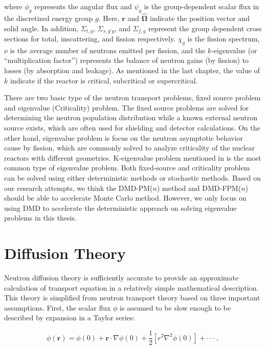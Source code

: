 where $\phi_g$ represents the angular flux and $\psi_g$ is the group-dependent scalar flux in the discretized energy group $g$.  
Here, $\mathbf{r}$ and $\bm{\hat{\Omega}}$ indicate the position vector and solid angle.
In addition, $\Sigma_{t,g}$, $\Sigma_{s,g\prime g}$, and $\Sigma_{f,g}$ represent the group dependent cross sections for total, inscattering, and fission respectively.  
$\chi_g$ is the fission spectrum, $\nu$ is the average number of neutrons emitted per fission, and the $k$-eigenvalue (or ``multiplication factor'') represents the balance of neutron gains (by fission) to losses (by absorption and leakage).  
As mentioned in the last chapter, the value of $k$ indicate if the reactor is critical, subcritical or supercritical.

There are two basic type of the neutron transport problems, fixed source problem and eigenvalue (Criticality) problem.  
The fixed source problems are solved for determining the neutron population distribution while a known external neutron source exists, which are often used for shielding and detector calculations.
On the other hand, eigenvalue problem is focus on the neutron asymptotic behavior cause by fission, which are commonly solved to analyze criticality of the nuclear reactors with different geometries.
K-eigenvalue problem mentioned in  is the most common type of eigenvalue problem.
Both fixed-source and criticality problem can be solved using either deterministic methods or stochastic methods.
Based on our research attempts, we think the DMD-PM($n$) method and DMD-FPM($n$) should be able to accelerate Monte Carlo method. 
However, we only focus on using DMD to accelerate the deterministic approach on solving eigenvalue problems in this thesis.

\section{Diffusion Theory}
Neutron diffusion theory is sufficiently accurate to provide an approximate calculation of transport equation in a relatively simple mathematical description.
This theory is simplified from neutron transport theory based on three important assumptions\cite{stacey2018nuclear}.
First, the scalar flux $\phi$ is assumed to be slow enough to be described by expansion in a Taylor series:

\begin{equation}
 \phi(\mathbf{r}) = \phi(0) + \mathbf{{r}} \cdot \nabla \phi(0) + \frac{1}{2}[r^2 \nabla^2 \phi(0)] + \cdot \cdot \cdot  \, ,
 \label{eq:taylor}
\end{equation}

